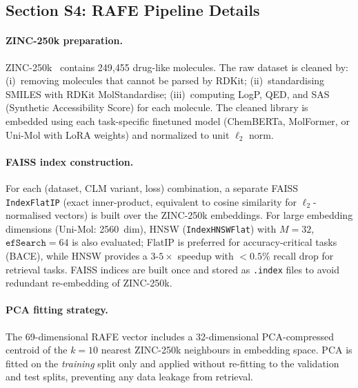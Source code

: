 \documentclass[9pt,a4paper]{article}
\begin{document}
\subsection*{Section S4: RAFE Pipeline Details}

\paragraph{ZINC-250k preparation.}
ZINC-250k~\cite{gomez2018automatic} contains 249{,}455 drug-like molecules.
The raw dataset is cleaned by: (i)~removing molecules that cannot be parsed by
RDKit; (ii)~standardising SMILES with RDKit MolStandardise; (iii)~computing
LogP, QED, and SAS (Synthetic Accessibility Score) for each molecule.
The cleaned library is embedded using each task-specific finetuned model
(ChemBERTa, MolFormer, or Uni-Mol with LoRA weights) and normalized to unit $\ell_2$ norm.

\paragraph{FAISS index construction.}
For each (dataset, CLM variant, loss) combination, a separate FAISS
\texttt{IndexFlatIP} (exact inner-product, equivalent to cosine similarity for
$\ell_2$-normalised vectors) is built over the ZINC-250k embeddings.
For large embedding dimensions (Uni-Mol: 2560~dim), HNSW (\texttt{IndexHNSWFlat})
with $M = 32$, $\texttt{efSearch} = 64$ is also evaluated; FlatIP is preferred
for accuracy-critical tasks (BACE), while HNSW provides a $3$-$5\times$ speedup
with $< 0.5\%$ recall drop for retrieval tasks.
FAISS indices are built once and stored as \texttt{.index} files to avoid redundant
re-embedding of ZINC-250k.

\paragraph{PCA fitting strategy.}
The 69-dimensional RAFE vector includes a 32-dimensional PCA-compressed centroid of the $k=10$ nearest ZINC-250k neighbours in embedding space.
PCA is fitted on the \emph{training} split only and applied without re-fitting to the validation and test splits, preventing any data leakage from retrieval.
\end{document}
